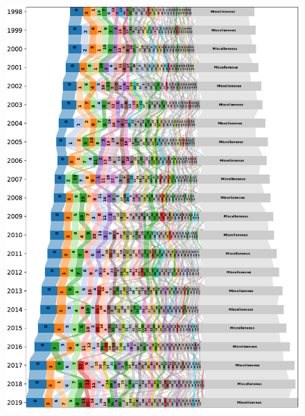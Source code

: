 \documentclass[varwidth, border=0pt]{standalone}
\begin{document}
	
	\begin{figure}
		\includegraphics[width=\linewidth]{../../graphics/sankey_de_reg_0-0_1-0_-1_a-infomap_n100_m1-0_s0_c1000_labels.pdf}
	\end{figure}
	
\end{document}
